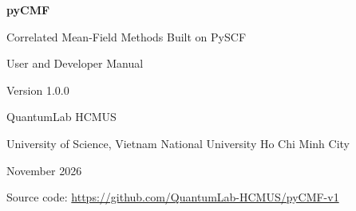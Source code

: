 \documentclass[11pt,a4paper,oneside]{report}
\begin{document}
\begin{titlepage}
  \centering
  \vspace*{3cm}
  {\Huge\bfseries pyCMF\par}
  \vspace{0.6cm}
  {\Large Correlated Mean-Field Methods Built on PySCF\par}
  \vspace{1.5cm}
  {\Large User and Developer Manual\par}
  \vspace{0.4cm}
  {\large Version 1.0.0\par}
  \vfill
  {\large QuantumLab HCMUS\par}
  \vspace{0.2cm}
  {University of Science, Vietnam National University Ho Chi Minh City\par}
  \vspace{1cm}
  {November 2026\par}
  \vspace{0.5cm}
  {\small Source code: \url{https://github.com/QuantumLab-HCMUS/pyCMF-v1}\par}
\end{titlepage}

\tableofcontents
\clearpage
{}









\appendix



\end{document}
